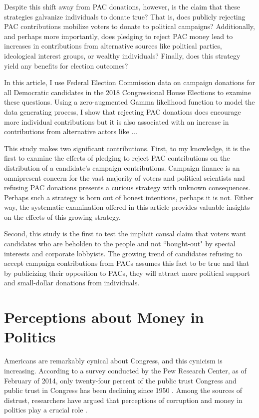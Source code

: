 \documentclass[12pt]{article}
\begin{document}
Despite this shift away from PAC donations, however, is the claim that these strategies galvanize individuals to donate true? That is, does publicly rejecting PAC contributions mobilize voters to donate to political campaigns? Additionally, and perhaps more importantly, does pledging to reject PAC money lead to increases in contributions from alternative sources like political parties, ideological interest groups, or wealthy individuals? Finally, does this strategy yield any benefits for election outcomes?

In this article, I use Federal Election Commission data on campaign donations for all Democratic candidates in the 2018 Congressional House Elections to examine these questions. 
Using a zero-augmented Gamma likelihood function to model the data generating process, I show that rejecting PAC donations does encourage more individual contributions but it is also associated with an increase in contributions from alternative actors like ... 


This study makes two significant contributions. First, to my knowledge, it is the first to examine the effects of pledging to reject PAC contributions on the distribution of a  candidate's campaign contributions. Campaign finance is an omnipresent concern for the vast majority of voters and political scientists and refusing PAC donations presents a curious strategy with unknown consequences. Perhaps such a strategy is born out of honest intentions, perhaps it is not. Either way, the systematic examination offered in this article provides valuable insights on the effects of this growing strategy. 

Second, this study is the first to test the implicit causal claim that voters want candidates who are beholden to the people and not ``bought-out" by special interests and corporate lobbyists. The growing trend of candidates refusing to accept campaign contributions from PACs assumes this fact to be true and that by publicizing their opposition to PACs, they will attract more political support and small-dollar donations from individuals.  


\section{Perceptions about Money in Politics}

 Americans are remarkably cynical about Congress, and this cynicism is increasing. According to a survey conducted by the Pew Research Center, as of February of 2014, only twenty-four percent of the public trust Congress \citep{pew_research_center_public_2014} and public trust in Congress has been declining since 1950 \citep{dalton_social_2005}. Among the sources of distrust, researchers have argued that perceptions of corruption and money in politics play a crucial role \citep{persily_perceptions_2004, vanheerde-hudson_parties_2013}. 
 
\end{document}

